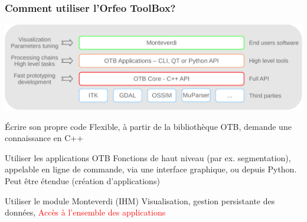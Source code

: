 \documentclass[8pt]{beamer}
\begin{document}
\begin{frame}
\frametitle{Comment utiliser l'Orfeo ToolBox?}
\vspace{-0.5cm}
\begin{center}
\includegraphics[width=\textwidth]{../OTB-General/images/sandwich.pdf}
\end{center}
\vspace{-0.5cm}
\begin{block}{Écrire son propre code}
 Flexible, à partir de la bibliothèque OTB, demande une connaissance en C++
\end{block}
\begin{block}{Utiliser les applications OTB}
 Fonctions de haut niveau (par ex. segmentation), appelable en ligne de commande, via une interface graphique, ou depuis Python. Peut être étendue (création d'applications)
\end{block}
\begin{block}{Utiliser le module Monteverdi (IHM)}
Visualisation, gestion persistante des données, \textcolor{red}{Accès à l'ensemble des applications}
\end{block}
\end{frame}
\end{document}
